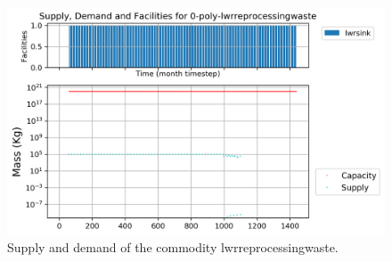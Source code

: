 \documentclass[11pt]{article}
\begin{document}
\begin{figure}[!h]
	\centering
	\includegraphics[width=\textwidth]{29-figures/0-poly-lwrreprocessingwaste.png} 
	\hfill
	\caption{Supply and demand of the commodity lwrreprocessingwaste.}
	\label{fig:29-lwrreprocessingwaste}
\end{figure}
\end{document}
